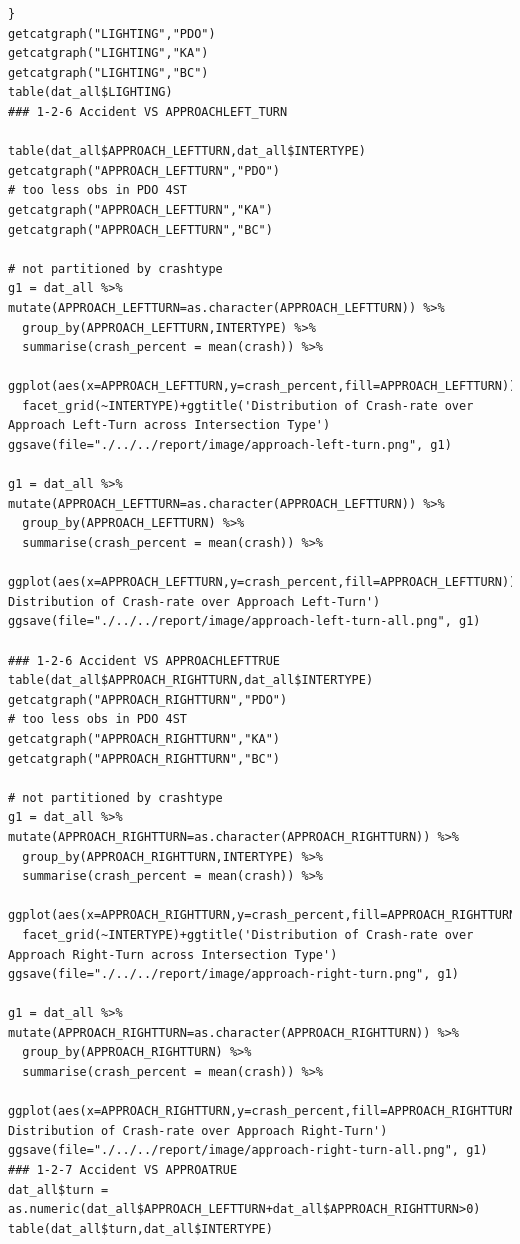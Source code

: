 \documentclass[11pt]{scrartcl} %
\begin{document}
\begin{lstlisting}
}
getcatgraph("LIGHTING","PDO")
getcatgraph("LIGHTING","KA")
getcatgraph("LIGHTING","BC")
table(dat_all$LIGHTING)
### 1-2-6 Accident VS APPROACHLEFT_TURN

table(dat_all$APPROACH_LEFTTURN,dat_all$INTERTYPE)
getcatgraph("APPROACH_LEFTTURN","PDO")
# too less obs in PDO 4ST
getcatgraph("APPROACH_LEFTTURN","KA")
getcatgraph("APPROACH_LEFTTURN","BC")

# not partitioned by crashtype
g1 = dat_all %>% mutate(APPROACH_LEFTTURN=as.character(APPROACH_LEFTTURN)) %>%
  group_by(APPROACH_LEFTTURN,INTERTYPE) %>%
  summarise(crash_percent = mean(crash)) %>%
  ggplot(aes(x=APPROACH_LEFTTURN,y=crash_percent,fill=APPROACH_LEFTTURN))+geom_bar(stat='identity')+
  facet_grid(~INTERTYPE)+ggtitle('Distribution of Crash-rate over Approach Left-Turn across Intersection Type')
ggsave(file="./../../report/image/approach-left-turn.png", g1)

g1 = dat_all %>% mutate(APPROACH_LEFTTURN=as.character(APPROACH_LEFTTURN)) %>%
  group_by(APPROACH_LEFTTURN) %>%
  summarise(crash_percent = mean(crash)) %>%
  ggplot(aes(x=APPROACH_LEFTTURN,y=crash_percent,fill=APPROACH_LEFTTURN))+geom_bar(stat='identity')+ggtitle('Overall Distribution of Crash-rate over Approach Left-Turn')
ggsave(file="./../../report/image/approach-left-turn-all.png", g1)

### 1-2-6 Accident VS APPROACHLEFTTRUE
table(dat_all$APPROACH_RIGHTTURN,dat_all$INTERTYPE)
getcatgraph("APPROACH_RIGHTTURN","PDO")
# too less obs in PDO 4ST
getcatgraph("APPROACH_RIGHTTURN","KA")
getcatgraph("APPROACH_RIGHTTURN","BC")

# not partitioned by crashtype
g1 = dat_all %>% mutate(APPROACH_RIGHTTURN=as.character(APPROACH_RIGHTTURN)) %>%
  group_by(APPROACH_RIGHTTURN,INTERTYPE) %>%
  summarise(crash_percent = mean(crash)) %>%
  ggplot(aes(x=APPROACH_RIGHTTURN,y=crash_percent,fill=APPROACH_RIGHTTURN))+geom_bar(stat='identity')+
  facet_grid(~INTERTYPE)+ggtitle('Distribution of Crash-rate over Approach Right-Turn across Intersection Type')
ggsave(file="./../../report/image/approach-right-turn.png", g1)

g1 = dat_all %>% mutate(APPROACH_RIGHTTURN=as.character(APPROACH_RIGHTTURN)) %>%
  group_by(APPROACH_RIGHTTURN) %>%
  summarise(crash_percent = mean(crash)) %>%
  ggplot(aes(x=APPROACH_RIGHTTURN,y=crash_percent,fill=APPROACH_RIGHTTURN))+geom_bar(stat='identity')+ggtitle('Overall Distribution of Crash-rate over Approach Right-Turn')
ggsave(file="./../../report/image/approach-right-turn-all.png", g1)
### 1-2-7 Accident VS APPROATRUE
dat_all$turn = as.numeric(dat_all$APPROACH_LEFTTURN+dat_all$APPROACH_RIGHTTURN>0)
table(dat_all$turn,dat_all$INTERTYPE)


\end{lstlisting}
\end{document}
